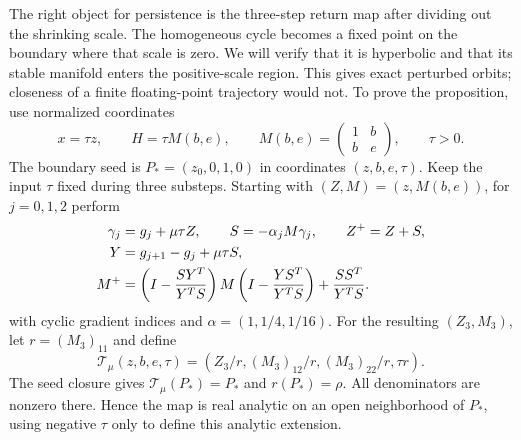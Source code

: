 The right object for persistence is the three-step return map after
dividing out the shrinking scale. The homogeneous cycle becomes a fixed
point on the boundary where that scale is zero. We will verify that it
is hyperbolic and that its stable manifold enters the positive-scale
region. This gives exact perturbed orbits; closeness of a finite
floating-point trajectory would not. To prove the proposition, use
normalized coordinates
\[
 x=\tau z,\qquad H=\tau M(b,e),\qquad
 M(b,e)=\begin{pmatrix}1&b\\b&e\end{pmatrix},\qquad\tau>0.
\]
The boundary seed is $P_*=(z_0,0,1,0)$ in coordinates $(z,b,e,\tau)$.
Keep the input $\tau$ fixed during three substeps. Starting with
$(Z,M)=(z,M(b,e))$, for $j=0,1,2$ perform
\begin{align}
 \gamma_j&=g_j+\mu\tau Z,\qquad S=-\alpha_jM\gamma_j,
       \qquad Z^+=Z+S,\label{art:lower_return_substep}\\
 Y&=g_{j+1}-g_j+\mu\tau S,\notag\\
 M^+&=\left(I-\frac{SY^T}{Y^TS}\right)M
          \left(I-\frac{YS^T}{Y^TS}\right)+\frac{SS^T}{Y^TS}.\notag
\end{align}
with cyclic gradient indices and $\alpha=(1,1/4,1/16)$.
For the resulting $(Z_3,M_3)$, let $r=(M_3)_{11}$ and define
\begin{equation}\label{art:lower_return}
 \mathcal T_\mu(z,b,e,\tau)
 =\left(Z_3/r, (M_3)_{12}/r, (M_3)_{22}/r, \tau r\right).
\end{equation}
The seed closure gives $\mathcal T_\mu(P_*)=P_*$ and $r(P_*)=\rho$.
All denominators are nonzero there. Hence the map is real analytic on an
open neighborhood of $P_*$, using negative $\tau$ only to define this
analytic extension.

